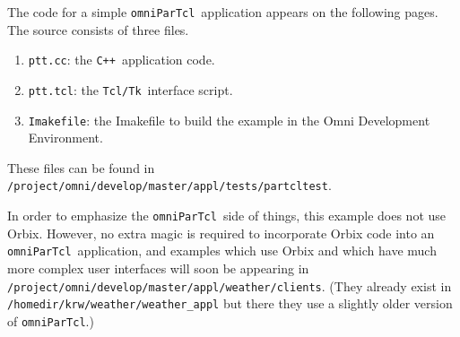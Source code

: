 \documentclass[11pt]{article}
\def\omniParTcl{{\tt omniParTcl}}
\def\tcltk{{\tt Tcl/Tk}}
\def\CXX{{\tt C++}}
\begin{document}
The code for a simple \omniParTcl\ application appears on the following
pages.  The source consists of three files.

\begin{enumerate}
\item {\tt ptt.cc}: the \CXX\ application code.
\item {\tt ptt.tcl}: the \tcltk\ interface script.
\item {\tt Imakefile}: the Imakefile to build the example in the Omni
                       Development Environment.
\end{enumerate}

\noindent
These files can be found in
{\tt /project/omni/develop/master/appl/tests/partcltest}.

\medskip

In order to emphasize the \omniParTcl\ side of things, this example does
not use Orbix.  However, no extra magic is required to incorporate Orbix
code into an \omniParTcl\ application, and examples which use Orbix
and which have much more complex user interfaces will soon be
appearing in {\tt /project/omni/develop/master/appl/weather/clients}.
(They already exist in {\tt /homedir/krw/weather/weather\_appl} but there
they use a slightly older version of \omniParTcl.)
\end{document}
